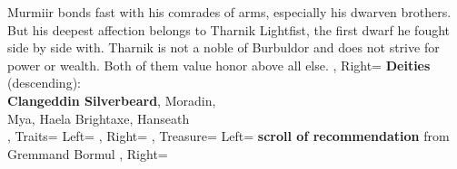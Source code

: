 \documentclass[10pt,a4paper]{scrbook}
\begin{document}
{{{				%
				Murmiir bonds fast with his comrades of arms, especially his dwarven brothers.
				But his deepest affection belongs to Tharnik Lightfist, the first dwarf he fought side by side with.
				Tharnik is not a noble of Burbuldor and does not strive for power or wealth.
				Both of them value honor above all else.
			},
			Right={
				\textbf{Deities} (descending):\\
				\textbf{Clangeddin Silverbeard}, Moradin,\\
				Mya, Haela Brightaxe, Hanseath\\
			}
		},
		Traits={
			Left={
			},
			Right={
			}
		},
		Treasure={
			Left={
				\textbf{scroll of recommendation} from Gremmand Bormul
			},
			Right={
			}
		}
	}

\end{document}
